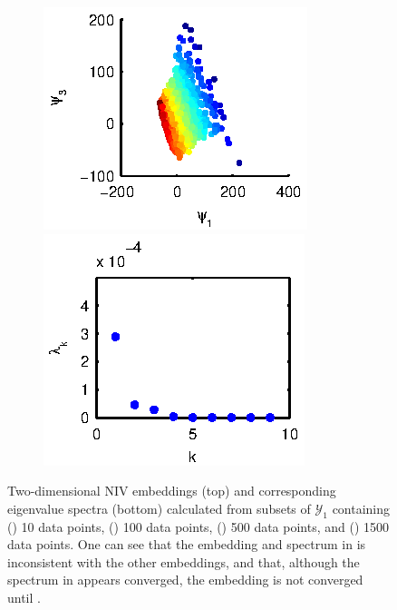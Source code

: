 \begin{figure}[t]
\begin{subfigure}{0.22\textwidth}
\includegraphics[width=\textwidth]{rxn_npoints_embed6}\\
\includegraphics[width=\textwidth]{rxn_npoints_spectrum6}
\caption{}
\label{subfig:rxn_convergence4}
\end{subfigure}    
\caption[Convergence of intrinsic variable embeddings as a function of the number of data points]{Two-dimensional NIV embeddings (top) and corresponding eigenvalue spectra (bottom) calculated from subsets of $\mathcal{Y}_1$ containing () 10 data points, () 100 data points, () 500 data points, and () 1500 data points. One can see that the embedding and spectrum in  is inconsistent with the other embeddings, and that, although the spectrum in  appears converged, the embedding is not converged until . }
\label{fig:rxn_convergence}
\end{figure}

